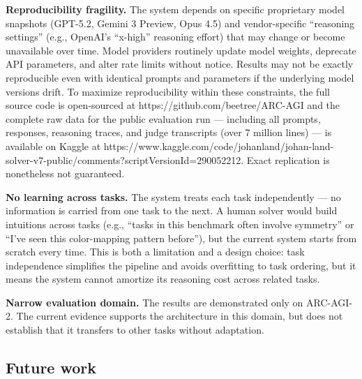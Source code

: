 \documentclass[11pt]{article}
\begin{document}
\textbf{Reproducibility fragility.} The system depends on specific
proprietary model snapshots (GPT-5.2, Gemini 3 Preview, Opus 4.5) and
vendor-specific ``reasoning settings'' (e.g., OpenAI's ``x-high''
reasoning effort) that may change or become unavailable over time. Model
providers routinely update model weights, deprecate API parameters, and
alter rate limits without notice. Results may not be exactly
reproducible even with identical prompts and parameters if the
underlying model versions drift. To maximize reproducibility within
these constraints, the full source code is open-sourced at
https://github.com/beetree/ARC-AGI and the complete raw data for the
public evaluation run --- including all prompts, responses, reasoning
traces, and judge transcripts (over 7 million lines) --- is available on
Kaggle at
https://www.kaggle.com/code/johanland/johan-land-solver-v7-public/comments?scriptVersionId=290052212.
Exact replication is nonetheless not guaranteed.

\textbf{No learning across tasks.} The system treats each task
independently --- no information is carried from one task to the next. A
human solver would build intuitions across tasks (e.g., ``tasks in this
benchmark often involve symmetry'' or ``I've seen this color-mapping
pattern before''), but the current system starts from scratch every
time. This is both a limitation and a design choice: task independence
simplifies the pipeline and avoids overfitting to task ordering, but it
means the system cannot amortize its reasoning cost across related
tasks.

\textbf{Narrow evaluation domain.} The results are demonstrated only on
ARC-AGI-2. The current evidence supports the architecture in this
domain, but does not establish that it transfers to other tasks without
adaptation.

\hypertarget{future-work}{%
\subsection{Future work}\label{future-work}}
\end{document}
